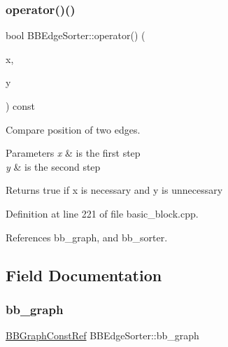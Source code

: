 \subsubsection{\texorpdfstring{operator()()}{operator()()}}
{\footnotesize\ttfamily bool B\+B\+Edge\+Sorter\+::operator() (\begin{DoxyParamCaption}\item[{const \hyperlink{graph_8hpp_a9eb9afea34e09f484b21f2efd263dd48}{Edge\+Descriptor}}]{x,  }\item[{const \hyperlink{graph_8hpp_a9eb9afea34e09f484b21f2efd263dd48}{Edge\+Descriptor}}]{y }\end{DoxyParamCaption}) const}



Compare position of two edges. 


\begin{DoxyParams}{Parameters}
{\em x} & is the first step \\
\hline
{\em y} & is the second step \\
\hline
\end{DoxyParams}
\begin{DoxyReturn}{Returns}
true if x is necessary and y is unnecessary 
\end{DoxyReturn}


Definition at line 221 of file basic\+\_\+block.\+cpp.



References bb\+\_\+graph, and bb\+\_\+sorter.



\subsection{Field Documentation}
\mbox{\label{classBBEdgeSorter_acc9c83f70d7b969748d9c2f8561f6e5c}} 
\subsubsection{\texorpdfstring{bb\+\_\+graph}{bb\_graph}}
{\footnotesize\ttfamily \hyperlink{basic__block_8hpp_ab66bdbde3a29e41d079d8a320af9c921}{B\+B\+Graph\+Const\+Ref} B\+B\+Edge\+Sorter\+::bb\+\_\+graph\hspace{0.3cm}{\ttfamily [private]}}



